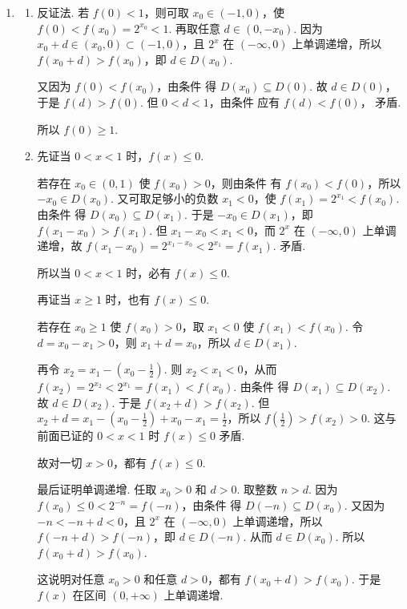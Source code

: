 \documentclass[UTF8,a4paper,oneside,11pt]{ctexbook}
\begin{document}
\begin{solution}
\begin{enumerate}
若 \(x_1<0<x_2\)，则 \(f(x_1)=2^{x_1}>0>-2^{-x_2}=f(x_2)\)，
这与 \(f(x_1)\le f(x_2)\) 矛盾，所以这种情况不可能出现.

若 \(x_2<0<x_1\)，则 \(f(x_2)=2^{x_2}>0>-2^{-x_1}=f(x_1)\)，从而 \(f(x_1)\le f(x_2)\) 恒成立. 此时 \(D(x_2)=\left( 0,-x_2 \right)\subseteq \left( 0,+\infty \right)\subseteq D(x_1)\).

综上，总有 \(D(x_2)\subseteq D(x_1)\).

\item
\begin{enumerate}
\item 反证法. 若 \(f(0)<1\)，则可取 \(x_0\in(-1,0)\)，使 \(f(0)<f(x_0)=2^{x_0}<1\). 再取任意 \(d\in\left( 0,-x_0 \right)\). 因为 \(x_0+d\in(x_0,0)\subset(-1,0)\)，且 \(2^x\) 在 \((-\infty,0)\) 上单调递增，所以 \(f(x_0+d)>f(x_0)\)，即 \(d\in D(x_0)\).

又因为 \(f(0)<f(x_0)\)，由条件  得 \(D(x_0)\subseteq D(0)\). 故 \(d\in D(0)\)，于是 \(f(d)>f(0)\). 但 \(0<d<1\)，由条件  应有 \(f(d)<f(0)\)，
矛盾.

所以 \(f(0)\ge 1\).

\item 先证当 \(0<x<1\) 时，\(f(x)\le 0\).

若存在 \(x_0\in(0,1)\) 使 \(f(x_0)>0\)，则由条件  有 \(f(x_0)<f(0)\)，所以 \(-x_0\in D(x_0)\). 又可取足够小的负数 \(x_1<0\)，使 \(f(x_1)=2^{x_1}<f(x_0)\). 由条件  得 \(D(x_0)\subseteq D(x_1)\). 于是 \(-x_0\in D(x_1)\)，即 \(f(x_1-x_0)>f(x_1)\).
但 \(x_1-x_0<x_1<0\)，而 \(2^x\) 在 \((-\infty,0)\) 上单调递增，故 \(f(x_1-x_0)=2^{x_1-x_0}<2^{x_1}=f(x_1)\).
矛盾.

所以当 \(0<x<1\) 时，必有 \(f(x)\le 0\).

再证当 \(x\ge 1\) 时，也有 \(f(x)\le 0\).

若存在 \(x_0\ge 1\) 使 \(f(x_0)>0\)，取 \(x_1<0\) 使 \(f(x_1)<f(x_0)\). 令 \(d=x_0-x_1>0\)，则 \(x_1+d=x_0\)，所以 \(d\in D(x_1)\).

再令 \(x_2=x_1-\left( x_0-\frac{1}{2} \right)\). 则 \(x_2<x_1<0\)，从而 \(f(x_2)=2^{x_2}<2^{x_1}=f(x_1)<f(x_0)\). 由条件  得 \(D(x_1)\subseteq D(x_2)\). 故 \(d\in D(x_2)\). 于是 \(f(x_2+d)>f(x_2)\). 但 \(x_2+d=x_1-\left( x_0-\frac{1}{2} \right)+x_0-x_1=\frac{1}{2}\)，所以 \(f\left( \frac{1}{2} \right)>f(x_2)>0\).
这与前面已证的 \(0<x<1\) 时 \(f(x)\le 0\) 矛盾.

故对一切 \(x>0\)，都有 \(f(x)\le 0\).

最后证明单调递增. 任取 \(x_0>0\) 和 \(d>0\). 取整数 \(n>d\). 因为 \(f(x_0)\le 0<2^{-n}=f(-n)\)，由条件  得 \(D(-n)\subseteq D(x_0)\). 又因为 \(-n< -n+d<0\)，且 \(2^x\) 在 \((-\infty,0)\) 上单调递增，所以 \(f(-n+d)>f(-n)\)，即 \(d\in D(-n)\). 从而 \(d\in D(x_0)\). 所以 \(f(x_0+d)>f(x_0)\).

这说明对任意 \(x_0>0\) 和任意 \(d>0\)，都有 \(f(x_0+d)>f(x_0)\).
于是 \(f(x)\) 在区间 \((0,+\infty)\) 上单调递增.
\end{enumerate}
\end{enumerate}
\end{solution}

\end{document}
